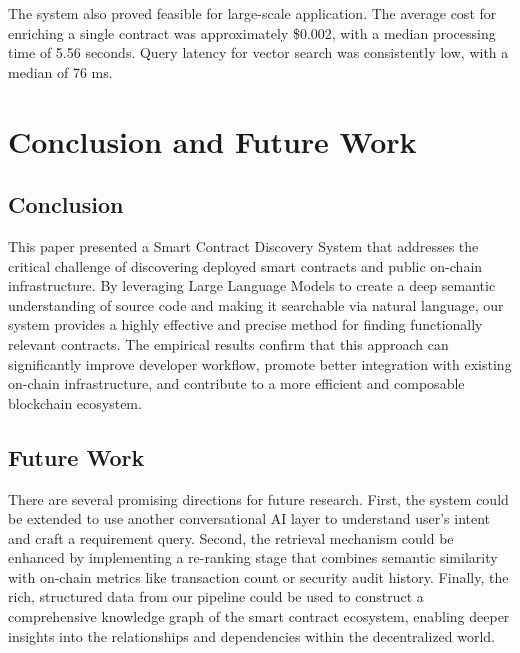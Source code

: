 The system also proved feasible for large-scale application. The average cost for enriching a single contract was approximately \$0.002, with a median processing time of 5.56 seconds. Query latency for vector search was consistently low, with a median of 76 ms.

\section{Conclusion and Future Work}\label{sec:conclusion}

\subsection{Conclusion}
This paper presented a Smart Contract Discovery System that addresses the critical challenge of discovering deployed smart contracts and public on-chain infrastructure. By leveraging Large Language Models to create a deep semantic understanding of source code and making it searchable via natural language, our system provides a highly effective and precise method for finding functionally relevant contracts. The empirical results confirm that this approach can significantly improve developer workflow, promote better integration with existing on-chain infrastructure, and contribute to a more efficient and composable blockchain ecosystem.

\subsection{Future Work}
There are several promising directions for future research. First, the system could be extended to use another conversational AI layer to understand user's intent and craft a requirement query. Second, the retrieval mechanism could be enhanced by implementing a re-ranking stage that combines semantic similarity with on-chain metrics like transaction count or security audit history. Finally, the rich, structured data from our pipeline could be used to construct a comprehensive knowledge graph of the smart contract ecosystem, enabling deeper insights into the relationships and dependencies within the decentralized world.